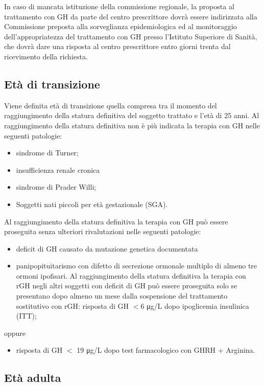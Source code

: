 In caso di mancata istituzione della commissione regionale, la proposta al trattamento con GH da parte del
centro prescrittore dovr\`a essere indirizzata alla Commissione preposta alla sorveglianza epidemiologica ed al
monitoraggio dell'appropriatezza del trattamento con GH presso l'Istituto Superiore di Sanit\`a, che dovr\`a dare
una risposta al centro prescrittore entro giorni trenta dal ricevimento della richiesta.

\subsection*{Et\`a di transizione}

Viene definita et\`a di transizione quella compresa tra il momento del raggiungimento della statura definitiva del
soggetto trattato e l'et\`a di 25 anni.
Al raggiungimento della statura definitiva non \`e più indicata la terapia con GH nelle seguenti patologie:
\begin{itemize}
\item sindrome di Turner;
\item insufficienza renale cronica
\item sindrome di Prader Willi;
\item Soggetti nati piccoli per et\`a gestazionale (SGA).
\end{itemize}

Al raggiungimento della statura definitiva la terapia con GH può essere proseguita senza ulteriori rivalutazioni
nelle seguenti patologie:
\begin{itemize}
\item deficit di GH causato da mutazione genetica documentata
\item panipopituitarismo con difetto di secrezione ormonale multiplo di almeno tre ormoni ipofisari. Al
raggiungimento della statura definitiva la terapia con rGH negli altri soggetti con deficit di GH può essere
proseguita solo se presentano dopo almeno un mese dalla sospensione del trattamento sostitutivo con rGH:
risposta di GH $<$6 \unit{\micro g}/L dopo ipoglicemia insulinica (ITT);
\end{itemize}
oppure
\begin{itemize}
\item risposta di GH $<$ 19 \unit{\micro g}/L dopo test farmacologico con GHRH + Arginina.
\end{itemize}

\subsection*{Et\`a adulta}

